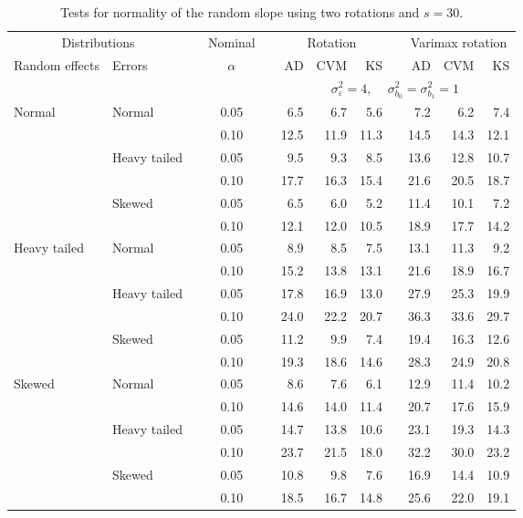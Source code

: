 \begin{table}[ht]
\caption{\label{tab:simb1s30-alt}Tests for normality of the random slope using two rotations and $s = 30$.}
\begin{scriptsize}
\begin{center}
\begin{tabular}{ll p{.1cm} c p{.1cm} rrr p{.1cm} rrr}
  \hline
  \multicolumn{2}{c}{Distributions}& & Nominal & &  \multicolumn{3}{c}{Rotation} & & \multicolumn{3}{c}{Varimax rotation} \\ \cline{1-2} \cline{6-8} \cline{10-12}   
  Random effects & Errors & & $\alpha$ & & AD & CVM & KS & & AD & CVM & KS \\ 
   \hline
& && && \multicolumn{7}{c}{$\sigma_{\varepsilon}^2 = 4$, \ \ $\sigma_{b_0}^2 = \sigma_{b_1}^2 = 1$} \\ \cline{6-12}
Normal       & Normal       && 0.05 &&   6.5 & 6.7 & 5.6 &   & 7.2 & 6.2 & 7.4 \\ 
             &              && 0.10 &&   12.5 & 11.9 & 11.3 &   & 14.5 & 14.3 & 12.1 \\ 
             & Heavy tailed && 0.05 &&   9.5 & 9.3 & 8.5 &   & 13.6 & 12.8 & 10.7 \\ 
             &              && 0.10 &&   17.7 & 16.3 & 15.4 &   & 21.6 & 20.5 & 18.7 \\ 
             & Skewed       && 0.05 &&   6.5 & 6.0 & 5.2 &   & 11.4 & 10.1 & 7.2 \\ 
             &              && 0.10 &&   12.1 & 12.0 & 10.5 &   & 18.9 & 17.7 & 14.2 \\ 
Heavy tailed & Normal       && 0.05 &&   8.9 & 8.5 & 7.5 &   & 13.1 & 11.3 & 9.2 \\ 
             &              && 0.10 &&   15.2 & 13.8 & 13.1 &   & 21.6 & 18.9 & 16.7 \\ 
             & Heavy tailed && 0.05 &&   17.8 & 16.9 & 13.0 &   & 27.9 & 25.3 & 19.9 \\ 
             &              && 0.10 &&   24.0 & 22.2 & 20.7 &   & 36.3 & 33.6 & 29.7 \\ 
             & Skewed       && 0.05 &&   11.2 & 9.9 & 7.4 &   & 19.4 & 16.3 & 12.6 \\ 
             &              && 0.10 &&   19.3 & 18.6 & 14.6 &   & 28.3 & 24.9 & 20.8 \\ 
Skewed       & Normal       && 0.05 &&   8.6 & 7.6 & 6.1 &   & 12.9 & 11.4 & 10.2 \\ 
             &              && 0.10 &&   14.6 & 14.0 & 11.4 &   & 20.7 & 17.6 & 15.9 \\ 
             & Heavy tailed && 0.05 &&   14.7 & 13.8 & 10.6 &   & 23.1 & 19.3 & 14.3 \\ 
             &              && 0.10 &&   23.7 & 21.5 & 18.0 &   & 32.2 & 30.0 & 23.2 \\ 
             & Skewed       && 0.05 &&   10.8 & 9.8 & 7.6 &   & 16.9 & 14.4 & 10.9 \\ 
             &              && 0.10 &&   18.5 & 16.7 & 14.8 &   & 25.6 & 22.0 & 19.1 \\ 


\end{tabular}
\end{center}
\end{scriptsize}
\end{table}
